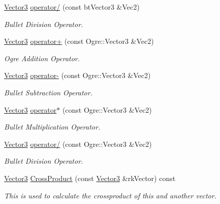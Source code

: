 \begin{DoxyCompactItemize}
\hyperlink{classphys_1_1Vector3}{Vector3} \hyperlink{classphys_1_1Vector3_a945287bb9448b2353c90e16c6cfed876}{operator/} (const btVector3 \&Vec2)
\begin{DoxyCompactList}\small\item\em Bullet Division Operator. \item\end{DoxyCompactList}\item 
\hyperlink{classphys_1_1Vector3}{Vector3} \hyperlink{classphys_1_1Vector3_a14ca2ae8bbe9ebefd298486b2a2ba5c9}{operator+} (const Ogre::Vector3 \&Vec2)
\begin{DoxyCompactList}\small\item\em Ogre Addition Operator. \item\end{DoxyCompactList}\item 
\hyperlink{classphys_1_1Vector3}{Vector3} \hyperlink{classphys_1_1Vector3_a54d5fc20ae502ac1443ddbb6cf1fbf1f}{operator-\/} (const Ogre::Vector3 \&Vec2)
\begin{DoxyCompactList}\small\item\em Bullet Subtraction Operator. \item\end{DoxyCompactList}\item 
\hyperlink{classphys_1_1Vector3}{Vector3} \hyperlink{classphys_1_1Vector3_a34014be39219a1ad3d4808b9614ac80d}{operator$\ast$} (const Ogre::Vector3 \&Vec2)
\begin{DoxyCompactList}\small\item\em Bullet Multiplication Operator. \item\end{DoxyCompactList}\item 
\hyperlink{classphys_1_1Vector3}{Vector3} \hyperlink{classphys_1_1Vector3_a4f9f3240dab2277e8a9b80f6c7235e5b}{operator/} (const Ogre::Vector3 \&Vec2)
\begin{DoxyCompactList}\small\item\em Bullet Division Operator. \item\end{DoxyCompactList}\item 
\hyperlink{classphys_1_1Vector3}{Vector3} \hyperlink{classphys_1_1Vector3_ae98b11238914cd77a729053798ebf339}{CrossProduct} (const \hyperlink{classphys_1_1Vector3}{Vector3} \&rkVector) const 
\begin{DoxyCompactList}\small\item\em This is used to calculate the crossproduct of this and another vector. \item\end{DoxyCompactList}\item 

\end{DoxyCompactItemize}
